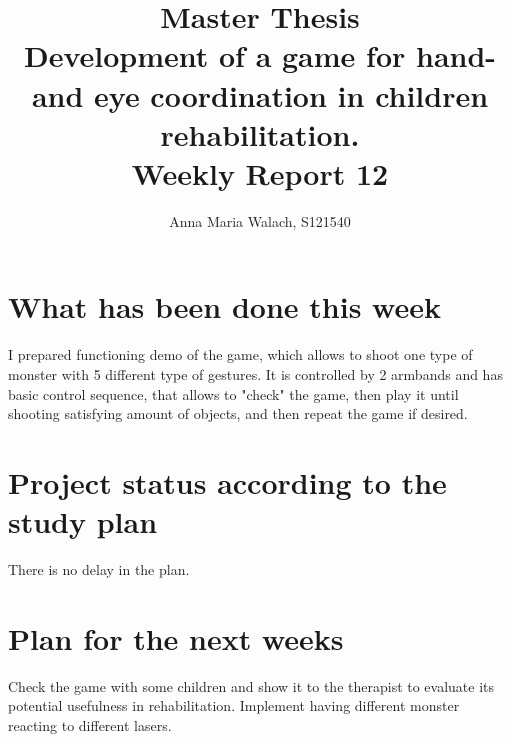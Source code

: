 \documentclass[10pt,a4paper]{article}
\title{{Master Thesis\\[0.5em]}
       {\bf \huge Development of a game for hand- and eye coordination in children rehabilitation.\\[0.5em]}
       {\bf Weekly Report 12}}
\author{Anna Maria Walach, S121540}
\begin{document}
\maketitle

\section*{What has been done this week}
I prepared functioning demo of the game, which allows to shoot one type of monster with 5 different type of gestures. It is controlled by 2 armbands and has basic control sequence, that allows to "check" the game, then play it until shooting satisfying amount of objects, and then repeat the game if desired.

\section*{Project status according to the study plan}
There is no delay in the plan.

\section*{Plan for the next weeks}
Check the game with some children and show it to the therapist to evaluate its potential usefulness in rehabilitation. Implement having different monster reacting to different lasers.



\end{document}
